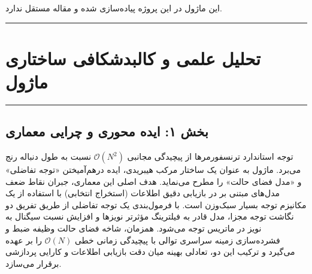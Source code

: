 \clearpage
{}
\vspace*{0.2cm}

این ماژول در این پروژه پیاده‌سازی شده و مقاله مستقل ندارد.
\noindent\rule{\textwidth}{1.2pt}
\vspace*{0.1cm}
\section{تحلیل علمی و کالبدشکافی ساختاری ماژول }
\label{sec:mod_hymba_transx}
\vspace*{-0.2cm}
\noindent\rule{\textwidth}{0.5pt}
\vspace*{0.3cm}

\subsection*{بخش ۱: ایده محوری و چرایی معماری }
توجه استاندارد ترنسفورمرها از پیچیدگی مجانبی $\mathcal{O}(N^2)$ نسبت به طول دنباله رنج می‌برد. ماژول  به عنوان یک ساختار مرکب هیبریدی، ایده درهم‌آمیختن «توجه تفاضلی»  و «مدل فضای حالت»  را مطرح می‌نماید. هدف اصلی این معماری، جبران نقاط ضعف مدل‌های مبتنی بر  در بازیابی دقیق اطلاعات (استخراج انتخابی) با استفاده از یک مکانیزم توجه بسیار سبک‌وزن است. با فرمول‌بندی یک توجه تفاضلی از طریق تفریق دو نگاشت توجه  مجزا، مدل قادر به فیلترینگ مؤثرتر نویزها و افزایش نسبت سیگنال به نویز در ماتریس توجه می‌شود. همزمان، شاخه فضای حالت وظیفه ضبط و فشرده‌سازی زمینه سراسری توالی با پیچیدگی زمانی خطی $\mathcal{O}(N)$ را بر عهده می‌گیرد و ترکیب این دو، تعادلی بهینه میان دقت بازیابی اطلاعات و کارایی پردازشی برقرار می‌سازد.

